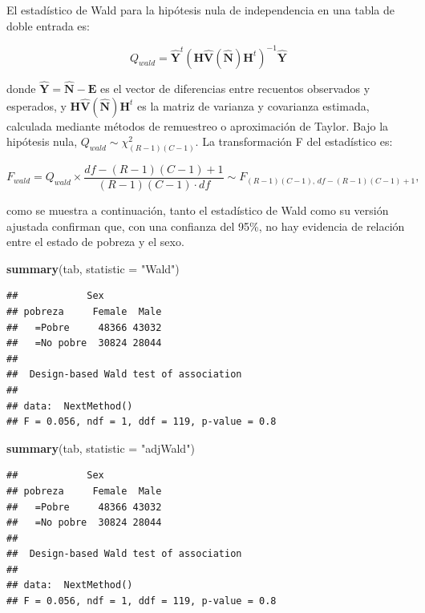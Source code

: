 \documentclass[
  spanish,
  12pt,
]{book}
\newenvironment{Shaded}{\begin{snugshade}}{\end{snugshade}}
\newcommand{\AttributeTok}[1]{\textcolor[rgb]{0.13,0.29,0.53}{#1}}
\newcommand{\FunctionTok}[1]{\textcolor[rgb]{0.13,0.29,0.53}{\textbf{#1}}}
\newcommand{\NormalTok}[1]{#1}
\newcommand{\StringTok}[1]{\textcolor[rgb]{0.31,0.60,0.02}{#1}}
\begin{document}
El estadístico de Wald para la hipótesis nula de independencia en una tabla de doble entrada es:

\[
Q_{wald} = \hat{\boldsymbol{Y}}^t \left(\boldsymbol{H} \hat{\boldsymbol{V}}(\hat{\boldsymbol{N}}) \boldsymbol{H}^t \right)^{-1} \hat{\boldsymbol{Y}}
\]

donde \(\hat{\boldsymbol{Y}} = \boldsymbol{\hat{N}} - \boldsymbol{E}\) es el vector de diferencias entre recuentos observados y esperados, y \(\boldsymbol{H}\hat{\boldsymbol{V}}(\hat{\boldsymbol{N}})\boldsymbol{H}^t\) es la matriz de varianza y covarianza estimada, calculada mediante métodos de remuestreo o aproximación de Taylor. Bajo la hipótesis nula, \(Q_{wald} \sim \chi^2_{(R-1)(C-1)}\). La transformación F del estadístico es:

\[
F_{wald} = Q_{wald} \times \frac{df - (R-1)(C-1) + 1}{(R-1)(C-1) \cdot df} \sim F_{(R-1)(C-1),\, df-(R-1)(C-1)+1},
\]

como se muestra a continuación, tanto el estadístico de Wald como su versión ajustada confirman que, con una confianza del 95\%, no hay evidencia de relación entre el estado de pobreza y el sexo.

\begin{Shaded}
\begin{Highlighting}[]
\FunctionTok{summary}\NormalTok{(tab, }\AttributeTok{statistic =} \StringTok{"Wald"}\NormalTok{)}
\end{Highlighting}
\end{Shaded}

\begin{verbatim}
##            Sex
## pobreza     Female  Male
##   =Pobre     48366 43032
##   =No pobre  30824 28044
## 
##  Design-based Wald test of association
## 
## data:  NextMethod()
## F = 0.056, ndf = 1, ddf = 119, p-value = 0.8
\end{verbatim}

\begin{Shaded}
\begin{Highlighting}[]
\FunctionTok{summary}\NormalTok{(tab, }\AttributeTok{statistic =} \StringTok{"adjWald"}\NormalTok{)}
\end{Highlighting}
\end{Shaded}

\begin{verbatim}
##            Sex
## pobreza     Female  Male
##   =Pobre     48366 43032
##   =No pobre  30824 28044
## 
##  Design-based Wald test of association
## 
## data:  NextMethod()
## F = 0.056, ndf = 1, ddf = 119, p-value = 0.8
\end{verbatim}
\end{document}
